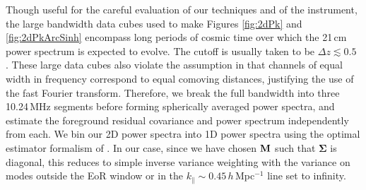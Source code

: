Though useful for the careful evaluation of our techniques and of the instrument, the large bandwidth data cubes used to make Figures \ref{fig:2dPk} and \ref{fig:2dPkArcSinh} encompass long periods of cosmic time over which the 21\,cm power spectrum is expected to evolve. The cutoff is usually taken to be $\Delta z \lesssim 0.5$ \cite{mao08}. These large data cubes also violate the assumption in \cite{DillonFast} that channels of equal width in frequency correspond to equal comoving distances, justifying the use of the fast Fourier transform. Therefore, we break the full bandwidth into three 10.24\,MHz segments before forming spherically averaged power spectra, and estimate the foreground residual covariance and power spectrum independently from each. We bin our 2D power spectra into 1D power spectra using the optimal estimator formalism of \cite{X13}. In our case, since we have chosen $\mathbf{M}$ such that $\boldsymbol\Sigma$ is diagonal, this reduces to simple inverse variance weighting with the variance on modes outside the EoR window or in the $k_\| \sim 0.45$\,$h$\,Mpc$^{-1}$ line set to infinity.

